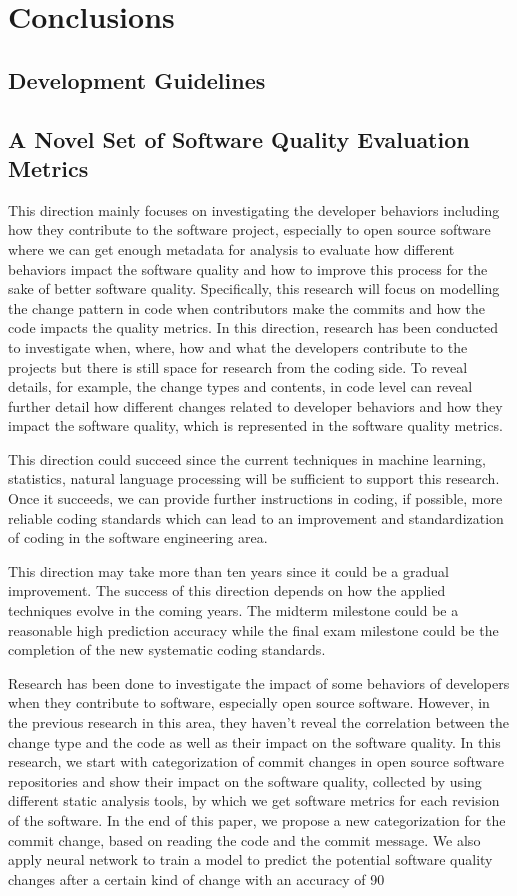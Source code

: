 \section{Conclusions}
\label{sec:conclusion}
\subsection{Development Guidelines}
\subsection{A Novel Set of Software Quality Evaluation Metrics}


This direction mainly focuses on investigating the developer behaviors including how they contribute to the software project, especially to open source software where we can get enough metadata for analysis to evaluate how different behaviors impact the software quality and how to improve this process for the sake of better software quality. Specifically, this research will focus on modelling the change pattern in code when contributors make the commits and how the code impacts the quality metrics. In this direction, research has been conducted to investigate when, where, how and what the developers contribute to the projects but there is still space for research from the coding side. To reveal details, for example, the change types and contents, in code level can reveal further detail how different changes related to developer behaviors and how they impact the software quality, which is represented in the software quality metrics.

This direction could succeed since the current techniques in machine learning, statistics, natural language processing will be sufficient to support this research. Once it succeeds, we can provide further instructions in coding, if possible, more reliable coding standards which can lead to an improvement and standardization of coding in the software engineering area.

This direction may take more than ten years since it could be a gradual improvement. The success of this direction depends on how the applied techniques evolve in the coming years. The midterm milestone could be a reasonable high prediction accuracy while the final exam milestone could be the completion of the new systematic coding standards.


Research has been done to investigate the impact of some behaviors of developers when they contribute to software, especially open source software. However, in the previous research in this area, they haven't reveal the correlation between the change type and the code as well as their impact on the software quality. In this research, we start with categorization of commit changes in open source software repositories and show their impact on the software quality, collected by using different static analysis tools, by which we get software metrics for each revision of the software. In the end of this paper, we propose a new categorization for the commit change, based on reading the code and the commit message. We also apply neural network to train a model to predict the potential software quality changes after a certain kind of change with an accuracy of 90%

